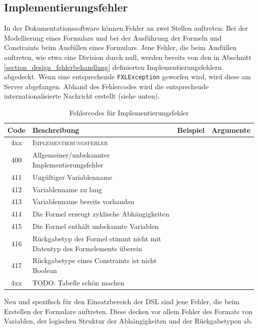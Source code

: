 \subsection{Implementierungsfehler}

In der Dokumentationssoftware können Fehler an zwei Stellen auftreten: Bei der Modellierung eines Formulars und bei der Ausführung der Formeln und Constraints beim Ausfüllen eines Formulars. Jene Fehler, die beim Ausfüllen auftreten, wie etwa eine Division durch null, werden bereits von den in Abschnitt \ref{section_design_fehlerbehandlung} definierten Implementierungsfehlern abgedeckt. Wenn eine entsprechende \texttt{FXLException} geworfen wird, wird diese am Server abgefangen. Abhand des Fehlercodes wird die entsprechende internationalisierte Nachricht erstellt (siehe unten). 


\begin{table}
\begin{tabular}[ht]{|c | p{6cm} | p{2cm}| p{3cm} |}
	\hline
	\textbf{Code} & \textbf{Beschreibung} & \textbf{Beispiel} & \textbf{Argumente}\\
	\hline
  	\hline
  	4xx  & \multicolumn{3}{|l|}{\textsc{Implementierungsfehler}} \\
  	\hline
  	400  & Allgemeiner/unbekannter Implementierungsfehler &  & \\
  	\hline
  	411  & Ungültiger Variablenname & & \\
  	\hline
  	412  & Variablenname zu lang & & \\
  	\hline
  	413  & Variablenname bereits vorhanden & &\\
  	\hline
  	414  & Die Formel erzeugt zyklische Abhängigkeiten & & \\
  	\hline
  	415  & Die Formel enthält unbekannte Variablen & & \\
  	\hline
  	416  & Rückgabetyp der Formel stimmt nicht mit Datentyp des Formelements überein & & \\
  	\hline
  	417  & Rückgabetype eines Constraints ist nicht Boolean & & \\
  	\hline
  	4xx  & TODO: Tabelle schön machen & & \\
  	\hline
\end{tabular}
\caption{Fehlercodes für Implementierungsfehler}
\end{table}

Neu und spezifisch für den Einsatzbereich der DSL sind jene Fehler, die beim Erstellen der Formulare auftreten. Diese decken vor allem Fehler des Formats von Variablen, der logischen Struktur der Abhängigkeiten und der Rückgabetypen ab.



